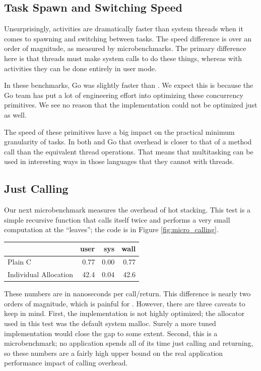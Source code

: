 \documentclass[acmsmall,anonymous,review]{acmart}\settopmatter{printfolios=true,printccs=false,printacmref=false}
\begin{document}
\subsection{Task Spawn and Switching Speed}

Unsurprisingly, activities are dramatically faster than system threads when it comes to spawning and switching between tasks.
The speed difference is over an order of magnitude, as measured by microbenchmarks.
The primary difference here is that threads must make system calls to do these things, whereas with activities they can be done entirely in user mode.

In these benchmarks, Go was slightly faster than \charcoal{}.
We expect this is because the Go team has put a lot of engineering effort into optimizing these concurrency primitives.
We see no reason that the \charcoal{} implementation could not be optimized just as well.

The speed of these primitives have a big impact on the practical minimum granularity of tasks.
In both \charcoal{} and Go that overhead is closer to that of a method call than the equivalent thread operations.
That means that multitasking can be used in interesting ways in those languages that they cannot with threads.

\subsection{Just Calling}

Our next microbenchmark measures the overhead of hot stacking.
This test is a simple recursive function that calls itself twice and performs a very small computation at the ``leaves''; the code is in Figure \ref{fig:micro_calling}.

\vspace{1em}
\begin{tabular}{|l|r|r|r|}
  \hline
   & user & sys & wall \\
  \hline
  \hline
  Plain C & 0.77 & 0.00 & 0.77 \\
  \hline
  Individual Allocation & 42.4 & 0.04 & 42.6 \\
  \hline
\end{tabular}
\vspace{1em}

These numbers are in nanoseconds per call/return.
This difference is nearly two orders of magnitude, which is painful for \charcoal{}.
However, there are three caveats to keep in mind.
First, the \charcoal{} implementation is not highly optimized; the allocator used in this test was the default system malloc.
Surely a more tuned implementation would close the gap to some extent.
Second, this is a microbenchmark; no application spends all of its time just calling and returning, so these numbers are a fairly high upper bound on the real application performance impact of calling overhead.
\end{document}
